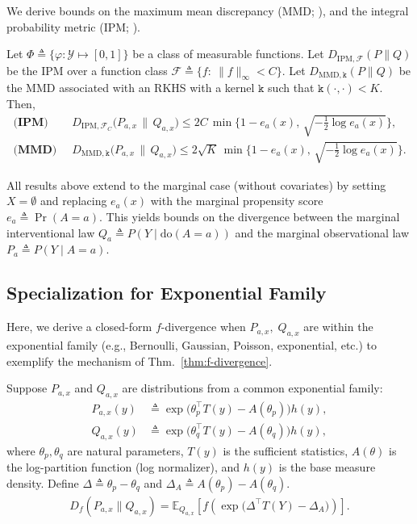 We derive bounds on the maximum mean discrepancy (MMD; \citealt{gretton2012kernel}), and the integral probability metric (IPM; \citealt{muller1997integral}). 
{
\renewcommand{\thecorollary}{T1.3}
\begin{corollary}\label{cor:mean-mmd-ipm}
    \normalfont
    Let $\Phi \triangleq \{\varphi: \mathcal{Y} \mapsto [0,1]\}$ be a class of measurable functions. Let $D_{\mathrm{IPM},\mathcal{F}}(P\|Q)$ be the IPM over a function class $\mathcal{F} \triangleq \big\{ f:\ \|f\|_{\infty} < C \big\}$. Let $D_{\mathrm{MMD},\mathtt{k}}(P\|Q)$ be the MMD associated with an RKHS with a kernel $\mathtt{k}$ such that $\mathtt{k}(\cdot,\cdot)<K$.  Then, 
    \begin{align*}
        \textbf{(IPM)} \;&\; D_{\mathrm{IPM},\mathcal{F}_C}\big(P_{a,x}\,\|\,Q_{a,x}\big) \leq 2C\,\min\big\{1-e_a(x),\, \sqrt{-\tfrac{1}{2}\log e_a(x)} \big\}, \\ 
        \textbf{(MMD)} \;&\;  D_{\mathrm{MMD},\mathtt{k}}\big(P_{a,x}\,\|\,Q_{a,x}\big) \leq 2\sqrt{K}\,\min\big\{1-e_a(x),\, \sqrt{-\tfrac{1}{2}\log e_a(x)} \big\}.
    \end{align*}
\end{corollary}
}

All results above extend to the marginal case (without covariates) by setting $X=\emptyset$ and replacing $e_a(x)$ with the marginal propensity score $e_a \triangleq \Pr(A=a)$. This yields bounds on the divergence between the marginal interventional law $Q_a \triangleq P(Y \mid \mathrm{do}(A=a))$ and the marginal observational law $P_a \triangleq P(Y \mid A=a)$. 


\subsection{Specialization for Exponential Family}\label{subsec:omit3-exponential-family}
Here, we derive a closed-form $f$-divergence when $P_{a,x},\; Q_{a,x}$ are within the exponential family (e.g., Bernoulli, Gaussian, Poisson, exponential, etc.) to exemplify the mechanism of Thm.~\ref{thm:f-divergence}.
\begin{corollary}
    \normalfont
    Suppose $P_{a,x}$ and $Q_{a,x}$ are distributions from a common exponential family:
    \begin{align}
        P_{a,x}(y) &\triangleq  \exp\big(\theta_p^\top T(y) - A(\theta_p)\big)h(y), \\ 
        Q_{a,x}(y) &\triangleq  \exp\big(\theta_q^\top T(y) - A(\theta_q)\big)h(y), 
    \end{align}
    where $\theta_p, \theta_q$ are  natural parameters, $T(y)$ is the sufficient statistics, $A(\theta)$ is the log-partition function (log normalizer), and $h(y)$ is the base measure density. Define $\Delta \triangleq \theta_p - \theta_q$ and $\Delta_A \triangleq A(\theta_p) - A(\theta_q)$. 
    \begin{align}
        D_{f}(P_{a,x}\|Q_{a,x})=
        \mathbb{E}_{Q_{a,x}}\left[
        f\left(
        \exp\big(\Delta^{\intercal} T(Y) - \Delta_A\big)
        \right)
        \right].
    \end{align}
\end{corollary}

